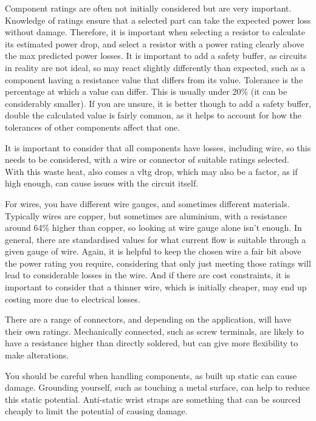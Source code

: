 \documentclass[a4paper,11pt]{report}
\begin{document}
Component ratings are often not initially considered but are very important. Knowledge of ratings ensure that a selected part can take the expected power loss without damage. Therefore, it is important when selecting a resistor to calculate its estimated power drop, and select a resistor with a power rating clearly above the max predicted power losses. It is important to add a safety buffer, as circuits in reality are not ideal, so may react slightly differently than expected, such as a component having a resistance value that differs from its value.
Tolerance is the percentage at which a value can differ. This is usually under 20\% (it can be considerably smaller). If you are unsure, it is better though to add a safety buffer, double the calculated value is fairly common, as it helps to account for how the tolerances of other components affect that one.

It is important to consider that all components have losses, including wire, so this needs to be considered, with a wire or connector of suitable ratings selected. With this waste heat, also comes a \gls{vltg} drop, which may also be a factor, as if high enough, can cause issues with the circuit itself.

For wires, you have different wire gauges, and sometimes different materials. Typically wires are copper, but sometimes are aluminium, with a resistance around 64\% higher than copper, so looking at wire gauge alone isn't enough. In general, there are standardised values for what current flow is suitable through a given gauge of wire. Again, it is helpful to keep the chosen wire a fair bit above the power rating you require, considering that only just meeting those ratings will lead to considerable losses in the wire. And if there are cost constraints, it is important to consider that a thinner wire, which is initially cheaper, may end up costing more due to electrical losses.

There are a range of connectors, and depending on the application, will have their own ratings. Mechanically connected, such as screw terminals, are likely to have a resistance higher than directly soldered, but can give more flexibility to make alterations.

You should be careful when handling components, as built up static can cause damage. Grounding yourself, such as touching a metal surface, can help to reduce this static potential. Anti-static wrist straps are something that can be sourced cheaply to limit the potential of causing damage.
\end{document}
